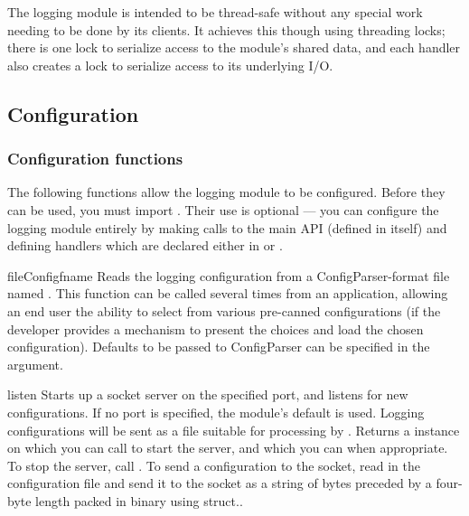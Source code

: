 The logging module is intended to be thread-safe without any special work
needing to be done by its clients. It achieves this though using threading
locks; there is one lock to serialize access to the module's shared data,
and each handler also creates a lock to serialize access to its underlying
I/O.

\subsection{Configuration}


\subsubsection{Configuration functions%
               \label{logging-config-api}}

The following functions allow the logging module to be
configured. Before they can be used, you must import
.  Their use is optional --- you can configure
the logging module entirely by making calls to the main API (defined
in  itself) and defining handlers which are declared
either in  or .

\begin{funcdesc}{fileConfig}{fname}
Reads the logging configuration from a ConfigParser-format file named
. This function can be called several times from an application,
allowing an end user the ability to select from various pre-canned
configurations (if the developer provides a mechanism to present the
choices and load the chosen configuration). Defaults to be passed to
ConfigParser can be specified in the  argument.
\end{funcdesc}

\begin{funcdesc}{listen}{}
Starts up a socket server on the specified port, and listens for new
configurations. If no port is specified, the module's default
 is used. Logging configurations
will be sent as a file suitable for processing by .
Returns a  instance on which you can call 
to start the server, and which you can  when appropriate.
To stop the server, call . To send a configuration
to the socket, read in the configuration file and send it to the socket
as a string of bytes preceded by a four-byte length packed in binary using
struct..
\end{funcdesc}


